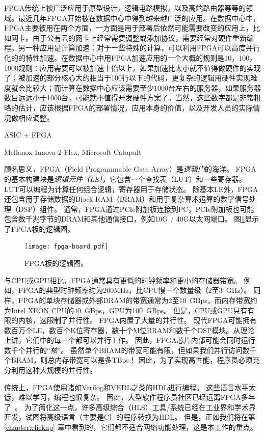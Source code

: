 FPGA传统上被广泛应用于原型设计，逻辑电路模拟，以及高端路由器等等的领域。最近几年FPGA开始被在数据中心中得到越来越广泛的应用。在数据中心中，FPGA主要被用在两个方面，一方面是用于部署后依然可能需要改变的应用上，比如网卡。由于公有云的网卡上经常需要调整或添加协议，需要经常对硬件重新编程。另一种应用是计算加速：对于一些特殊的计算，可以利用FPGA可以高度并行化的的特性加速。在数据中心中用FPGA加速应用的一个大概的规则是10，100，1000规则：应用需要可以被加速十倍以上，如果加速比太小就不值得做硬件的实现了；被加速的部分核心大约相当于100行以下的代码，更复杂的逻辑用硬件实现难度就会比较大；而计算在数据中心应该需要至少1000台左右的服务器，如果服务器数目远远小于1000台，可能就不值得开发硬件方案了。当然，这些数字都是非常粗略的估计，应该根据FPGA的部署情况，应用本身的价值，以及开发人员的实际情况做相应调整。

ASIC + FPGA

Mellanox Innova-2 Flex, Microsoft Catapult


顾名思义，FPGA（Field Programmable Gate Array）是\textit {逻辑门}的海洋。
FPGA的基本构建块是\textit {逻辑元件（LE）}，它包含一个查找表（LUT）和一些寄存器。
LUT可以编程为计算任何组合逻辑，寄存器用于存储状态。
除基本LE外，FPGA还包含用于存储数据的Block RAM（BRAM）和用于复杂算术运算的数字信号处理（DSP）组件。
通常，FPGA通过PCIe附加板连接到PC，PCIe附加板也可能包含数千兆字节的DRAM和其他通信接口，例如10G / 40G以太网端口。
图\ref{clicknp:fig:fpga}显示了FPGA板的逻辑图。

\begin{figure}[t]
	\centering
	\texttt{[image: fpga-board.pdf]}
	
	\caption{FPGA板的逻辑图。}
	\label{clicknp:fig:fpga}
	
\end{figure}


与CPU或GPU相比，FPGA通常具有更低的时钟频率和更小的存储器带宽。
例如，FPGA的典型时钟频率约为200MHz，比CPU慢一个数量级（2至3~GHz）。
同样，FPGA的单块存储器或外部DRAM的带宽通常为2至10~GBps，而内存带宽约为Intel XEON CPU的40~GBps，GPU为100~GBps。
但是，CPU或GPU只有有限的内核，这限制了并行性。 FPGA内置了大量的并行性。
现代FPGA可能拥有数百万个LE，数百个K位寄存器，数十个M位BRAM和数千个DSP模块。从理论上讲，它们中的每一个都可以并行工作。
因此，FPGA芯片内部可能会同时运行数千个并行的``\textit {核}''。
虽然单个BRAM的带宽可能有限，但如果我们并行访问数千个BRAM，则总内存带宽可以是多TBps！
因此，为了实现高性能，程序员必须充分利用这种大规模的并行性。

传统上，FPGA使用诸如Verilog和VHDL之类的HDL进行编程。
这些语言水平太低，难以学习，编程也很复杂。
因此，大型软件程序员社区已经远离FPGA多年了~\cite {bacon2013fpga}。
为了简化这一点，许多高级综合（HLS）工具/系统已经在工业界和学术界开发，试图将高级语言（主要是C）的程序转换为HDL。
但是，正如我们将在第 \ref{chapter:clicknp} 章中看到的，它们都不适合网络功能处理，这是本工作的重点。


